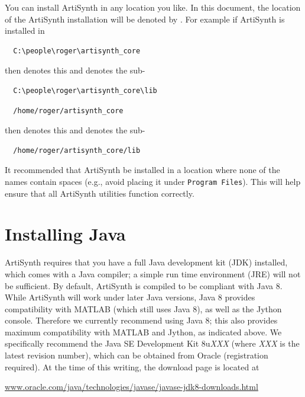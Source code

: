 You can install ArtiSynth in any location you like.
In this document, the location of the ArtiSynth installation \directory{}
will be denoted by \ArtHome[]. For example
if ArtiSynth is installed in
\ifWindows
\begin{verbatim}
  C:\people\roger\artisynth_core
\end{verbatim}
then \ArtHome[] denotes this \directory{}
and  denotes the sub-\directory{}
\begin{verbatim}
  C:\people\roger\artisynth_core\lib
\end{verbatim}
\else %
\begin{verbatim}
  /home/roger/artisynth_core
\end{verbatim}
then \ArtHome[] denotes this \directory{}
and  denotes the sub-\directory{}
\begin{verbatim}
  /home/roger/artisynth_core/lib
\end{verbatim}
\fi %

\ifLinux\else %
\begin{sideblock}
It recommended that ArtiSynth be installed in a location where none of
the \directory{} names contain spaces (e.g., avoid placing it under
{\tt Program Files}).  This will help ensure that all ArtiSynth
utilities function correctly.
\end{sideblock}
\fi %

\section{Installing Java}
\label{InstallingJava}

ArtiSynth requires that you have a full Java development kit (JDK)
installed, which comes with a Java compiler; a simple run time
environment (JRE) will not be sufficient.  By default, ArtiSynth is
compiled to be compliant with Java 8. While ArtiSynth will work under
later Java versions, Java 8 provides compatibility with MATLAB (which
still uses Java 8), as well as the Jython console.  Therefore we
currently recommend using Java 8; this also provides maximum
compatibility with MATLAB and Jython, as indicated above. We
specifically recommend the Java SE Development Kit 8u{\it XXX} (where
{\it XXX} is the latest revision number), which can be obtained from
Oracle (registration required).  At the time of this writing, the
download page is located at

\href{https://www.oracle.com/java/technologies/javase/javase-jdk8-downloads.html}%
{www.oracle.com/java/technologies/javase/javase-jdk8-downloads.html}

